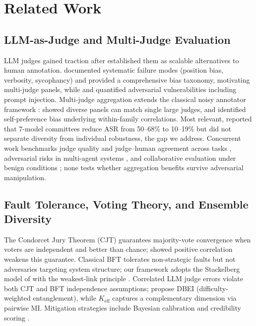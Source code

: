 \section{Related Work}

\subsection{LLM-as-Judge and Multi-Judge Evaluation}

LLM judges gained traction after \citet{zheng2023judging} established them as scalable alternatives to human annotation. \citet{wang2023fair} documented systematic failure modes (position bias, verbosity, sycophancy) and \citet{ye2024justice} provided a comprehensive bias taxonomy, motivating multi-judge panels, while \citet{raina2024judgerobust} and \citet{maloyan2025investigating} quantified adversarial vulnerabilities including prompt injection. Multi-judge aggregation extends the classical noisy annotator framework \citep{dawid1979maximum}: \citet{verga2024replacing} showed diverse panels can match single large judges, and \citet{panickssery2024llm} identified self-preference bias underlying within-family correlations. Most relevant, \citet{almasoud2026security} reported that 7-model committees reduce ASR from 50--68\% to 10--19\% but did not separate diversity from individual robustness, the gap we address. Concurrent work benchmarks judge quality \citep{tan2024judgebench,li2024autoj} and judge--human agreement across tasks \citep{bavaresco2025llms}, adversarial risks in multi-agent systems \citep{tamas2025benchmarking}, and collaborative evaluation under benign conditions \citep{qian2026collabeval}; none tests whether aggregation benefits survive adversarial manipulation.

\subsection{Fault Tolerance, Voting Theory, and Ensemble Diversity}

The Condorcet Jury Theorem (CJT) \citep{condorcet1785essai} guarantees majority-vote convergence when voters are independent and better than chance; \citet{ladha1992condorcet} showed positive correlation weakens this guarantee. Classical BFT \citep{lamport1982byzantine} tolerates non-strategic faults but not adversaries targeting system structure; our framework adopts the Stackelberg model of \citet{tambe2011security} with the weakest-link principle \citep{schneier2000secrets}. Correlated LLM judge errors \citep{kim2025correlated,kuai2026independent} violate both CJT and BFT independence assumptions; \citet{kuai2026independent} propose DBEI (difficulty-weighted entanglement), while $K_{\mathrm{eff}}$ captures a complementary dimension via pairwise MI. Mitigation strategies include Bayesian calibration and credibility scoring \citep{ebrahimi2025adversary}.

